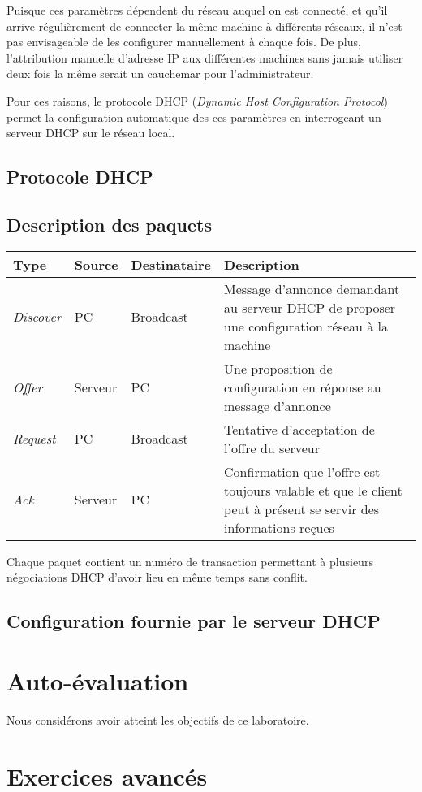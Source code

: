 \documentclass[11pt,a4paper]{article}
\begin{document}
Puisque ces paramètres dépendent du réseau auquel on est connecté, et qu'il arrive régulièrement de connecter la même machine à différents réseaux, il n'est pas envisageable de les configurer manuellement à chaque fois. De plus, l'attribution manuelle d'adresse IP aux différentes machines sans jamais utiliser deux fois la même serait un cauchemar pour l'administrateur.

Pour ces raisons, le protocole DHCP (\textit{Dynamic Host Configuration Protocol}) permet la configuration automatique des ces paramètres en interrogeant un serveur DHCP sur le réseau local.

\subsection{Protocole DHCP}

\subsection{Description des paquets}

\begin{tabular}{|l||l|l|p{9cm}|}
	\hline
	\textbf{Type} & \textbf{Source} & \textbf{Destinataire} & \textbf{Description} \\
	\hline
	\textit{Discover} & PC & Broadcast & Message d'annonce demandant au serveur DHCP de proposer une configuration réseau à la machine \\
	\hline
	\textit{Offer} & Serveur & PC & Une proposition de configuration en réponse au message d'annonce \\
	\hline
	\textit{Request} & PC & Broadcast & Tentative d'acceptation de l'offre du serveur \\
	\hline
	\textit{Ack} & Serveur & PC & Confirmation que l'offre est toujours valable et que le client peut à présent se servir des informations reçues \\
	\hline
\end{tabular}

\vspace{1em}

Chaque paquet contient un numéro de transaction permettant à plusieurs négociations DHCP d'avoir lieu en même temps sans conflit.

\subsection{Configuration fournie par le serveur DHCP}

\section{Auto-évaluation}

Nous considérons avoir atteint les objectifs de ce laboratoire.

\section{Exercices avancés}
\end{document}
